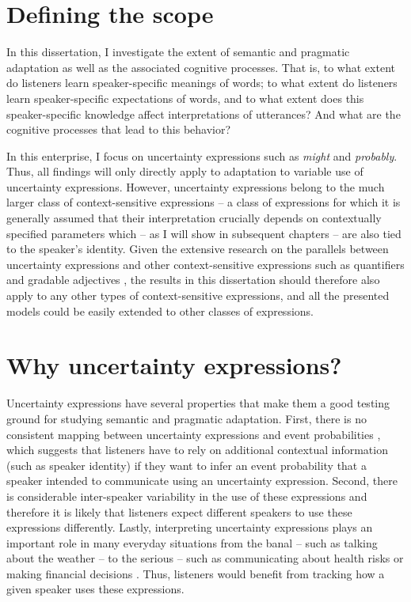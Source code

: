\section{Defining the scope}

In this dissertation, I investigate the extent of semantic and pragmatic adaptation as well as
the associated cognitive processes. That is, to what extent do listeners learn speaker-specific
meanings of words; to what extent do listeners learn speaker-specific expectations of words,
and to what extent does this speaker-specific knowledge affect interpretations of utterances? 
And what are the cognitive processes that lead to this behavior?

In this enterprise, I focus on uncertainty expressions
such as \emph{might} and \emph{probably}. Thus, all findings will only directly apply to 
adaptation to variable use of uncertainty expressions. However, uncertainty expressions 
belong to the much larger class of context-sensitive expressions -- a class of expressions for 
which it is generally assumed  that their interpretation crucially depends on contextually 
specified parameters which -- as I will show in subsequent chapters --
are also tied to the speaker's identity. Given the extensive research on the parallels between
uncertainty expressions and other context-sensitive expressions such as quantifiers and
gradable adjectives \cite{LassiterBook, SchoellerFranke?}, the results in this dissertation
should therefore also apply to any other types of context-sensitive expressions, and all
the presented models could be easily extended to other classes of expressions. 

\section{Why uncertainty expressions?}
\label{sec:why-uncertainty-expressions}

Uncertainty expressions have several properties that make them a good testing ground for studying semantic and pragmatic
adaptation. First, there is no consistent mapping between uncertainty expressions and event probabilities \cite{e.g., Clark1990,Pepper1974}, 
which suggests that listeners have to rely on additional contextual information (such as speaker identity)
if they want to infer an event probability that a speaker intended to communicate using an uncertainty expression. Second, there is considerable inter-speaker variability 
in the use of these expressions \cite{Wallsten1986} and therefore it is likely that listeners expect different speakers to use these expressions
differently. Lastly, interpreting uncertainty expressions plays an important role in many everyday situations from the banal -- 
such as talking about the weather -- to the serious -- such as communicating about health risks 
\cite{Berry2004, Lipkus2007, Politi2007} or making financial decisions \cite{Doupnik2003}. 
Thus, listeners would benefit from tracking  how a given speaker uses these expressions. 

